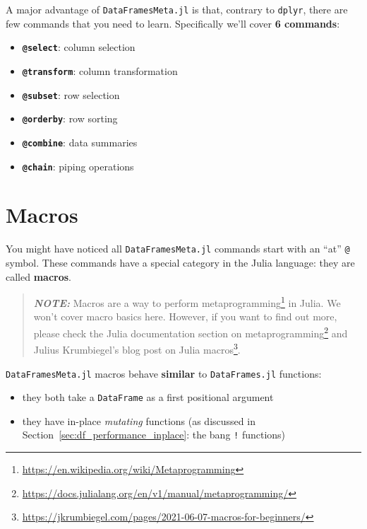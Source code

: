 \documentclass[
  notoc %
]{tufte-book}
\DeclareRobustCommand{\href}[2]{#2\footnote{\url{#1}}}
\providecommand{\tightlist}{%
  \setlength{\itemsep}{0pt}\setlength{\parskip}{0pt}
}
\newcommand{\passthrough}[1]{#1}
\begin{document}
A major advantage of \passthrough{\lstinline!DataFramesMeta.jl!} is
that, contrary to \passthrough{\lstinline!dplyr!}, there are few
commands that you need to learn. Specifically we'll cover \textbf{6
commands}:

\begin{itemize}
\tightlist
\item
  \textbf{\passthrough{\lstinline!@select!}}: column selection
\item
  \textbf{\passthrough{\lstinline!@transform!}}: column transformation
\item
  \textbf{\passthrough{\lstinline!@subset!}}: row selection
\item
  \textbf{\passthrough{\lstinline!@orderby!}}: row sorting
\item
  \textbf{\passthrough{\lstinline!@combine!}}: data summaries
\item
  \textbf{\passthrough{\lstinline!@chain!}}: piping operations
\end{itemize}

\hypertarget{sec:dataframesmeta_macros}{%
\section{Macros}\label{sec:dataframesmeta_macros}}

You might have noticed all \passthrough{\lstinline!DataFramesMeta.jl!}
commands start with an ``at'' \passthrough{\lstinline!@!} symbol. These
commands have a special category in the Julia language: they are called
\textbf{macros}.

\begin{quote}
\textbf{\emph{NOTE:}} Macros are a way to perform
\href{https://en.wikipedia.org/wiki/Metaprogramming}{metaprogramming} in
Julia. We won't cover macro basics here. However, if you want to find
out more, please check the
\href{https://docs.julialang.org/en/v1/manual/metaprogramming/}{Julia
documentation section on metaprogramming} and
\href{https://jkrumbiegel.com/pages/2021-06-07-macros-for-beginners/}{Julius
Krumbiegel's blog post on Julia macros}.
\end{quote}

\passthrough{\lstinline!DataFramesMeta.jl!} macros behave
\textbf{similar} to \passthrough{\lstinline!DataFrames.jl!} functions:

\begin{itemize}
\tightlist
\item
  they both take a \passthrough{\lstinline!DataFrame!} as a first
  positional argument
\item
  they have in-place \emph{mutating} functions (as discussed in
  Section~\ref{sec:df_performance_inplace}: the bang
  \passthrough{\lstinline"!"} functions)
\end{itemize}
\end{document}
